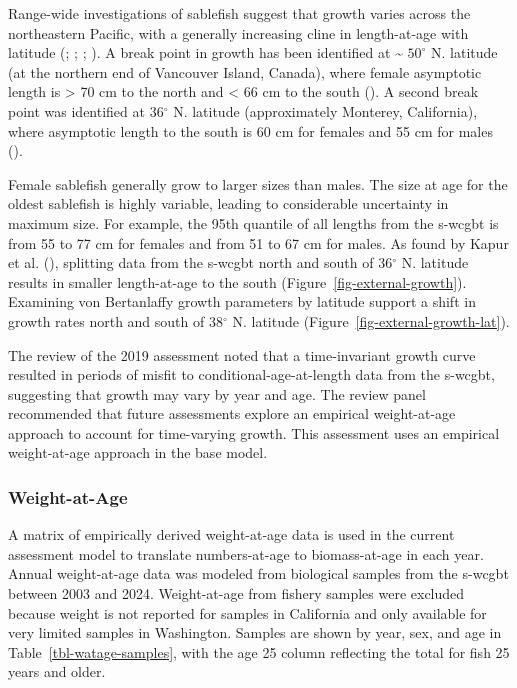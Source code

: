 \documentclass[
  english,
]{article}
\begin{document}
Range-wide investigations of sablefish suggest that growth varies across
the northeastern Pacific, with a generally increasing cline in
length-at-age with latitude
(;
;
;
). A break
point in growth has been identified at \textasciitilde{} \(50^\circ\) N.
latitude (at the northern end of Vancouver Island, Canada), where female
asymptotic length is \textgreater{} 70 cm to the north and \textless{}
66 cm to the south (). A second break point was identified at 36\(^\circ\) N. latitude
(approximately Monterey, California), where asymptotic length to the
south is 60 cm for females and 55 cm for males
().

Female sablefish generally grow to larger sizes than males. The size at
age for the oldest sablefish is highly variable, leading to considerable
uncertainty in maximum size. For example, the 95th quantile of all
lengths from the \gls{s-wcgbt} is from 55 to 77 cm for females and from
51 to 67 cm for males. As found by Kapur et al.
(), splitting data from the
\gls{s-wcgbt} north and south of 36\(^\circ\) N. latitude results in
smaller length-at-age to the south (Figure~\ref{fig-external-growth}).
Examining von Bertanlaffy growth parameters by latitude support a shift
in growth rates north and south of 38\(^\circ\) N. latitude
(Figure~\ref{fig-external-growth-lat}).

The review of the 2019 assessment noted that a time-invariant growth
curve resulted in periods of misfit to conditional-age-at-length data
from the \gls{s-wcgbt}, suggesting that growth may vary by year and age.
The review panel recommended that future assessments explore an
empirical weight-at-age approach to account for time-varying growth.
This assessment uses an empirical weight-at-age approach in the base
model.

\subsubsection{Weight-at-Age}\label{watage}

A matrix of empirically derived weight-at-age data is used in the
current assessment model to translate numbers-at-age to biomass-at-age
in each year. Annual weight-at-age data was modeled from biological
samples from the \gls{s-wcgbt} between 2003 and 2024. Weight-at-age from
fishery samples were excluded because weight is not reported for samples
in California and only available for very limited samples in Washington.
Samples are shown by year, sex, and age in
Table~\ref{tbl-watage-samples}, with the age 25 column reflecting the
total for fish 25 years and older.
\end{document}
